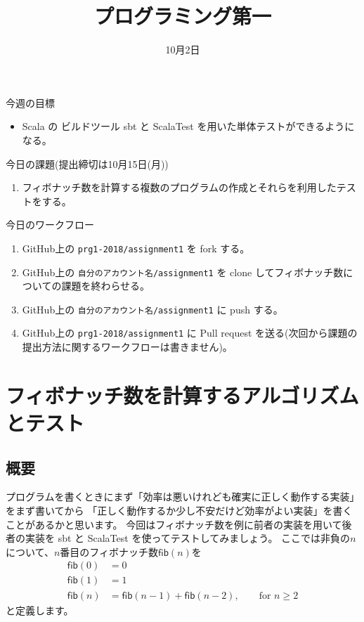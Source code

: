 \documentclass[a4paper,twoside,onecolumn,openany,article]{memoir}
\title{プログラミング第一}
\date{10月2日}
\theoremstyle{plain}
\theoremstyle{remark}
\def\repname{prg1-2018}
\begin{document}
\maketitle


\noindent
今週の目標
\begin{itemize}
\item Scala の ビルドツール sbt と ScalaTest を用いた単体テストができるようになる。
\end{itemize}

\noindent
今日の課題(提出締切は10月15日(月))
\begin{enumerate}
\item フィボナッチ数を計算する複数のプログラムの作成とそれらを利用したテストをする。
\end{enumerate}

\noindent
今日のワークフロー
\begin{enumerate}
\item GitHub上の \texttt{\repname/assignment1} を fork する。
\item GitHub上の \verb|自分のアカウント名/assignment1| を clone してフィボナッチ数についての課題を終わらせる。
\item GitHub上の \verb|自分のアカウント名/assignment1| に push する。
\item GitHub上の \texttt{\repname/assignment1} に Pull request を送る(次回から課題の提出方法に関するワークフローは書きません)。
\end{enumerate}

\section{フィボナッチ数を計算するアルゴリズムとテスト}
\subsection{概要}
プログラムを書くときにまず「効率は悪いけれども確実に正しく動作する実装」をまず書いてから
「正しく動作するか少し不安だけど効率がよい実装」を書くことがあるかと思います。
今回はフィボナッチ数を例に前者の実装を用いて後者の実装を sbt と ScalaTest を使ってテストしてみましょう。
ここでは非負の$n$について、$n$番目のフィボナッチ数$\mathsf{fib}(n)$を
\begin{align*}
\mathsf{fib}(0) &= 0\\
\mathsf{fib}(1) &= 1\\
\mathsf{fib}(n) &= \mathsf{fib}(n-1)+\mathsf{fib}(n-2),\qquad\text{for } n\ge 2
\end{align*}
と定義します。
\end{document}
